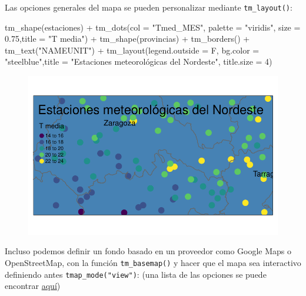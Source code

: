 \documentclass[
  letterpaper,
  DIV=11,
  numbers=noendperiod]{scrreprt}
\newenvironment{Shaded}{\begin{snugshade}}{\end{snugshade}}
\newcommand{\AttributeTok}[1]{\textcolor[rgb]{0.40,0.45,0.13}{#1}}
\newcommand{\DecValTok}[1]{\textcolor[rgb]{0.68,0.00,0.00}{#1}}
\newcommand{\FloatTok}[1]{\textcolor[rgb]{0.68,0.00,0.00}{#1}}
\newcommand{\FunctionTok}[1]{\textcolor[rgb]{0.28,0.35,0.67}{#1}}
\newcommand{\NormalTok}[1]{\textcolor[rgb]{0.00,0.23,0.31}{#1}}
\newcommand{\SpecialCharTok}[1]{\textcolor[rgb]{0.37,0.37,0.37}{#1}}
\newcommand{\StringTok}[1]{\textcolor[rgb]{0.13,0.47,0.30}{#1}}
\begin{document}
Las opciones generales del mapa se pueden personalizar mediante
\texttt{tm\_layout()}:

\begin{Shaded}
\begin{Highlighting}[]
\FunctionTok{tm\_shape}\NormalTok{(estaciones) }\SpecialCharTok{+}
    \FunctionTok{tm\_dots}\NormalTok{(}\AttributeTok{col =} \StringTok{"Tmed\_MES"}\NormalTok{, }\AttributeTok{palette =} \StringTok{"viridis"}\NormalTok{, }\AttributeTok{size =} \FloatTok{0.75}\NormalTok{,}\AttributeTok{title =} \StringTok{"T media"}\NormalTok{) }\SpecialCharTok{+}
\FunctionTok{tm\_shape}\NormalTok{(provincias) }\SpecialCharTok{+}
    \FunctionTok{tm\_borders}\NormalTok{() }\SpecialCharTok{+}
    \FunctionTok{tm\_text}\NormalTok{(}\StringTok{"NAMEUNIT"}\NormalTok{) }\SpecialCharTok{+}
    \FunctionTok{tm\_layout}\NormalTok{(}\AttributeTok{legend.outside =}\NormalTok{ F, }\AttributeTok{bg.color =} \StringTok{"steelblue"}\NormalTok{,}\AttributeTok{title =} \StringTok{"Estaciones meteorológicas del Nordeste"}\NormalTok{, }\AttributeTok{title.size =} \DecValTok{4}\NormalTok{)}
\end{Highlighting}
\end{Shaded}

\begin{figure}[H]

{\centering \includegraphics{03_DatosEspaciales_files/figure-pdf/unnamed-chunk-17-1.pdf}

}

\end{figure}

Incluso podemos definir un fondo basado en un proveedor como Google Maps
o OpenStreetMap, con la función \texttt{tm\_basemap()} y hacer que el
mapa sea interactivo definiendo antes \texttt{tmap\_mode("view")}: (una
lista de las opciones se puede encontrar
\href{https://leaflet-extras.github.io/leaflet-providers/preview/}{aquí})
\end{document}
